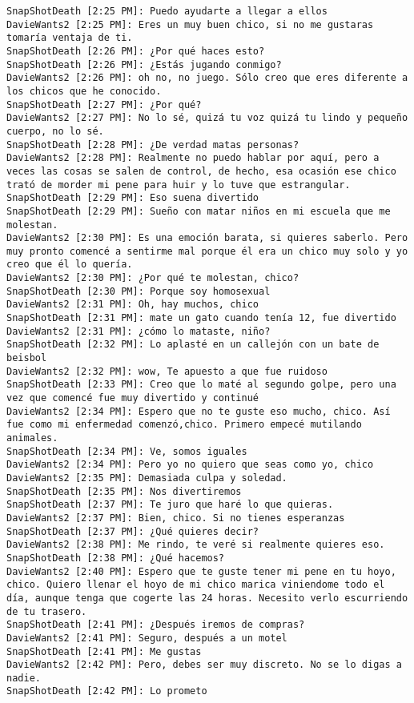 \begin{verbatim}
SnapShotDeath [2:25 PM]: Puedo ayudarte a llegar a ellos 
DavieWants2 [2:25 PM]: Eres un muy buen chico, si no me gustaras tomaría ventaja de ti. 
SnapShotDeath [2:26 PM]: ¿Por qué haces esto? 
SnapShotDeath [2:26 PM]: ¿Estás jugando conmigo? 
DavieWants2 [2:26 PM]: oh no, no juego. Sólo creo que eres diferente a los chicos que he conocido. 
SnapShotDeath [2:27 PM]: ¿Por qué? 
DavieWants2 [2:27 PM]: No lo sé, quizá tu voz quizá tu lindo y pequeño cuerpo, no lo sé. 
SnapShotDeath [2:28 PM]: ¿De verdad matas personas? 
DavieWants2 [2:28 PM]: Realmente no puedo hablar por aquí, pero a veces las cosas se salen de control, de hecho, esa ocasión ese chico trató de morder mi pene para huir y lo tuve que estrangular. 
SnapShotDeath [2:29 PM]: Eso suena divertido 
SnapShotDeath [2:29 PM]: Sueño con matar niños en mi escuela que me molestan.
DavieWants2 [2:30 PM]: Es una emoción barata, si quieres saberlo. Pero muy pronto comencé a sentirme mal porque él era un chico muy solo y yo creo que él lo quería. 
DavieWants2 [2:30 PM]: ¿Por qué te molestan, chico? 
SnapShotDeath [2:30 PM]: Porque soy homosexual
DavieWants2 [2:31 PM]: Oh, hay muchos, chico 
SnapShotDeath [2:31 PM]: mate un gato cuando tenía 12, fue divertido 
DavieWants2 [2:31 PM]: ¿cómo lo mataste, niño? 
SnapShotDeath [2:32 PM]: Lo aplasté en un callejón con un bate de beisbol 
DavieWants2 [2:32 PM]: wow, Te apuesto a que fue ruidoso 
SnapShotDeath [2:33 PM]: Creo que lo maté al segundo golpe, pero una vez que comencé fue muy divertido y continué 
DavieWants2 [2:34 PM]: Espero que no te guste eso mucho, chico. Así fue como mi enfermedad comenzó,chico. Primero empecé mutilando animales. 
SnapShotDeath [2:34 PM]: Ve, somos iguales 
DavieWants2 [2:34 PM]: Pero yo no quiero que seas como yo, chico 
DavieWants2 [2:35 PM]: Demasiada culpa y soledad. 
SnapShotDeath [2:35 PM]: Nos divertiremos 
SnapShotDeath [2:37 PM]: Te juro que haré lo que quieras. 
DavieWants2 [2:37 PM]: Bien, chico. Si no tienes esperanzas 
SnapShotDeath [2:37 PM]: ¿Qué quieres decir? 
DavieWants2 [2:38 PM]: Me rindo, te veré si realmente quieres eso. 
SnapShotDeath [2:38 PM]: ¿Qué hacemos? 
DavieWants2 [2:40 PM]: Espero que te guste tener mi pene en tu hoyo, chico. Quiero llenar el hoyo de mi chico marica viniendome todo el día, aunque tenga que cogerte las 24 horas. Necesito verlo escurriendo de tu trasero. 
SnapShotDeath [2:41 PM]: ¿Después iremos de compras? 
DavieWants2 [2:41 PM]: Seguro, después a un motel 
SnapShotDeath [2:41 PM]: Me gustas 
DavieWants2 [2:42 PM]: Pero, debes ser muy discreto. No se lo digas a nadie. 
SnapShotDeath [2:42 PM]: Lo prometo 

\end{verbatim}
